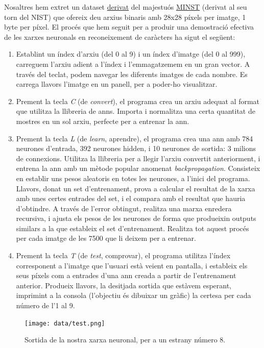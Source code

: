 Nosaltres hem extret un dataset \href{http://cis.jhu.edu/~sachin/digit/digit.html}{derivat} del majestuós \href{http://yann.lecun.com/exdb/mnist/}{MINST} (derivat al seu torn del NIST)
que ofereix deu arxius binaris amb 28x28 píxels per imatge, 1 byte per píxel. El procés que hem seguit per a produir una demostració efectiva de les 
xarxes neuronals en reconeixement de caràcters ha sigut el següent:

\begin{enumerate}
\item Establint un índex d'arxiu (del 0 al 9) i un índex d'imatge (del 0 al 999), carreguem l'arxiu adient a l'índex i l'emmagatzemem en un gran vector. A través del teclat, podem
navegar les diferents imatges de cada nombre. Es carrega llavors l'imatge en un panell, per a poder-ho visualitzar.
\item Prement la tecla \emph{C} (de \emph{convert}), el programa crea un arxiu adequat al format que utilitza la llibreria de \ac{ann}s. Importa i normalitza una certa quantitat 
de mostres en un sol arxiu, perfecte per a entrenar la \ac{ann}.
\item Prement la tecla \emph{L} (de \emph{learn}, aprendre), el programa crea una \ac{ann} amb 784 neurones d'entrada, 392 neurones hidden, i 10 neurones de sortida: 3 milions de connexions. Utilitza la 
llibreria per a llegir l'arxiu convertit anteriorment, i entrena la \ac{ann} amb un mètode popular anomenat \emph{backpropagation}. Consisteix en establir uns pesos aleatoris 
en totes les neurones, a l'inici del programa. Llavors, donat un set d'entrenament, prova a calcular el resultat de la xarxa amb unes certes entrades del set, i el compara amb el resultat
que hauria d'obtindre. A través de l'error obtingut, realitza una marxa enredera recursiva, i ajusta els pesos de les neurones de forma que produeixin outputs similars a la que
estableix el set d'entrenament. Realitza tot aquest procés per cada imatge de les 7500 que li deixem per a entrenar.
\item Prement la tecla \emph{T} (de \emph{test}, comprovar), el programa utilitza l'índex corresponent a l'imatge que l'usuari està veient en pantalla, i estableix els seus píxels
com a entrades d'una \ac{ann} creada a partir de l'entrenament anterior. Produeix llavors, la desitjada sortida que estàvem esperant, imprimint a la consola (l'objectiu és dibuixar un gràfic)
la certesa per cada número de l'1 al 9.
\end{enumerate}


\begin{figure}[ht!]
\centering
\texttt{[image: data/test.png]}
\caption{Sortida de la nostra xarxa neuronal, per a un estrany número 8.}
\label{output}
\end{figure}


